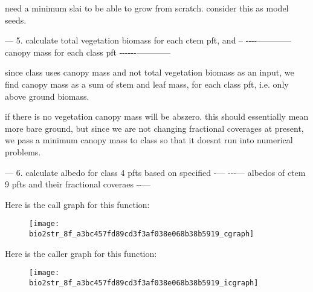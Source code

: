 need a minimum slai to be able to grow from scratch. consider this as model seeds.

--- 5. calculate total vegetation biomass for each ctem pft, and -- -\/-\/-\/-\/------------ canopy mass for each class pft -\/-\/-\/-\/-\/-\/------------

since class uses canopy mass and not total vegetation biomass as an input, we find canopy mass as a sum of stem and leaf mass, for each class pft, i.\+e. only above ground biomass.

if there is no vegetation canopy mass will be abszero. this should essentially mean more bare ground, but since we are not changing fractional coverages at present, we pass a minimum canopy mass to class so that it doesn\textquotesingle{}t run into numerical problems.

--- 6. calculate albedo for class\textquotesingle{} 4 pfts based on specified -\/--- -\/-\/-\/--- albedos of ctem 9 pfts and their fractional coveraes -\/-\/---

Here is the call graph for this function\+:\nopagebreak
\begin{figure}[H]
\begin{center}
\leavevmode
\texttt{[image: bio2str\_8f\_a3bc457fd89cd3f3af038e068b38b5919\_cgraph]}
\end{center}
\end{figure}




Here is the caller graph for this function\+:\nopagebreak
\begin{figure}[H]
\begin{center}
\leavevmode
\texttt{[image: bio2str\_8f\_a3bc457fd89cd3f3af038e068b38b5919\_icgraph]}
\end{center}
\end{figure}


